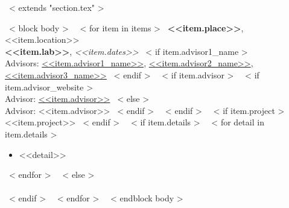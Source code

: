 ~< extends "section.tex" >~

~< block body >~
    ~< for item in items >~
        {\bf <<item.place>>}, <<item.location>> \\
        {\bf <<item.lab>>}, {\it <<item.dates>> }
        ~< if item.advisor1_name >~
            \\
            Advisors: \href{<<item.advisor1_website>>}{\color{links}<<item.advisor1_name>>}, \href{<<item.advisor2_website>>}{\color{links}<<item.advisor2_name>>}, \href{<<item.advisor3_website>>}{\color{links}<<item.advisor3_name>>}
        ~< endif >~
        ~< if item.advisor >~
            ~< if item.advisor_website >~
                \\ Advisor: \href{<<item.advisor_website>>}{\color{links}<<item.advisor>>}
            ~< else >~
                \\ Advisor: <<item.advisor>> 
            ~< endif >~
        ~< endif >~
        ~< if item.project >~ \\ <<item.project>> ~< endif >~
        ~< if item.details >~
            ~< for detail in item.details >~
            \begin{itemize}
              \item <<detail>>
            \end{itemize}
            ~< endfor >~
        ~< else >~
        \\ \\
        ~< endif >~
    ~< endfor >~
~< endblock body >~
